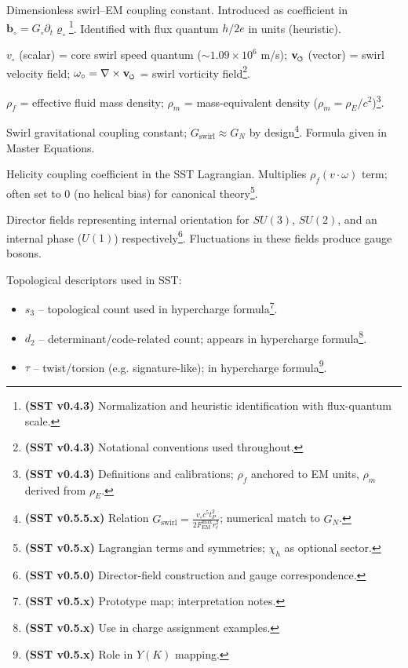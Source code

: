 \documentclass[reprint,aps,onecolumn,nofootinbib]{revtex4-2}
\newcommand{\swirlarrow}{%
    \mathchoice{\mkern-2mu\scriptstyle\boldsymbol{\circlearrowleft}}%
    {\mkern-2mu\scriptstyle\boldsymbol{\circlearrowleft}}%
    {\mkern-2mu\scriptscriptstyle\boldsymbol{\circlearrowleft}}%
    {\mkern-2mu\scriptscriptstyle\boldsymbol{\circlearrowleft}}%
}
\newcommand{\vswirl}{\mathbf{v}_{\swirlarrow}}
\newcommand{\FmaxEM}{F_{\mathrm{EM}}^{\max}}             %
\begin{document}
\begin{description}[leftmargin=1.3cm,labelsep=0.4cm, itemsep=1ex]
    \item[\textbf{$G_{\circ}$:}] Dimensionless swirl–EM coupling constant. Introduced as coefficient in $\mathbf{b}_{\circ}=G_{\circ}\partial_t \varrho_{\circ}$\footnote{\textbf{(SST v0.4.3)} Normalization and heuristic identification with flux-quantum scale.}. Identified with flux quantum $h/2e$ in units (heuristic).
    \item[\textbf{$v_{\circ}, \omega_{\circ}$:}] $v_{\circ}$ (scalar) = core swirl speed quantum ($\sim 1.09\times10^6$ m/s); $\vswirl$ (vector) = swirl velocity field; $\omega_{\circ} = \nabla \times \vswirl$ = swirl vorticity field\footnote{\textbf{(SST v0.4.3)} Notational conventions used throughout.}.
    \item[\textbf{$\rho_f, \rho_m$:}] $\rho_f$ = effective fluid mass density; $\rho_m$ = mass-equivalent density ($\rho_m = \rho_E/c^2$)\footnote{\textbf{(SST v0.4.3)} Definitions and calibrations; $\rho_f$ anchored to EM units, $\rho_m$ derived from $\rho_E$.}.
    \item[\textbf{$G_{\text{swirl}}$:}] Swirl gravitational coupling constant; $G_{\text{swirl}} \approx G_N$ by design\footnote{\textbf{(SST v0.5.5.x)} Relation $G_{\text{swirl}} = \frac{v_{\circ}c^5 t_P^2}{2\FmaxEM r_c^2}$; numerical match to $G_N$.}. Formula given in Master Equations.
    \item[\textbf{$\chi_h$:}] Helicity coupling coefficient in the SST Lagrangian. Multiplies $\rho_f (v\cdot \omega)$ term; often set to 0 (no helical bias) for canonical theory\footnote{\textbf{(SST v0.5.x)} Lagrangian terms and symmetries; $\chi_h$ as optional sector.}.
    \item[\textbf{$\mathbf{U}_3, \mathbf{U}_2, \vartheta$:}] Director fields representing internal orientation for $SU(3)$, $SU(2)$, and an internal phase ($U(1)$) respectively\footnote{\textbf{(SST v0.5.0)} Director-field construction and gauge correspondence.}. Fluctuations in these fields produce gauge bosons.
    \item[\textbf{Knot invariants $(s_3, d_2, \tau, L_{\text{tot}}, b, g, \phi)$:}] Topological descriptors used in SST:
    \begin{itemize}
    \item $s_3$ – topological count used in hypercharge formula\footnote{\textbf{(SST v0.5.x)} Prototype map; interpretation notes.}.
    \item $d_2$ – determinant/code-related count; appears in hypercharge formula\footnote{\textbf{(SST v0.5.x)} Use in charge assignment examples.}.
    \item $\tau$ – twist/torsion (e.g. signature-like); in hypercharge formula\footnote{\textbf{(SST v0.5.x)} Role in $Y(K)$ mapping.}.

\end{itemize}
\end{description}
\end{document}
